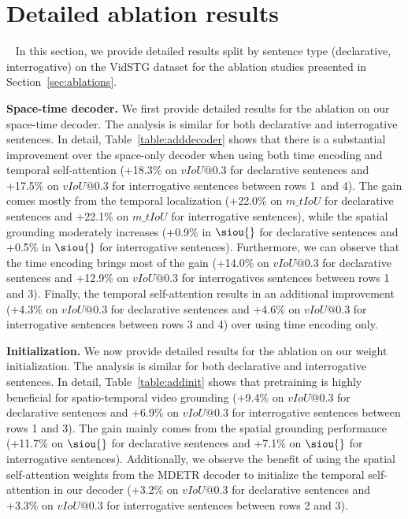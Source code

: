 \section{Detailed ablation results}~\label{sec:addablation}
In this section, we provide detailed results split by sentence type (declarative, interrogative) on the VidSTG dataset for the ablation studies presented in Section~\ref{sec:ablations}.

\noindent \textbf{Space-time decoder.}\label{sec:adddecoderres}
We first provide detailed results for the ablation on our space-time decoder. 
The analysis is similar for both declarative and interrogative sentences.
In detail, Table~\ref{table:adddecoder} shows that there is a substantial improvement over the space-only decoder when using both time encoding and temporal self-attention (+18.3\% on $vIoU@0.3$ for declarative sentences and +17.5\% on $vIoU@0.3$ for interrogative sentences between rows 1~and 4). 
The gain comes mostly from the temporal localization (+22.0\% on $m\_tIoU$ for declarative sentences and +22.1\% on $m\_tIoU$ for interrogative sentences), while the spatial grounding moderately increases (+0.9\% in $\siou{}$ for declarative sentences and +0.5\% in $\siou{}$ for interrogative sentences). 
Furthermore, we can observe that the time encoding brings most of the gain (+14.0\% on $vIoU@0.3$ for declarative sentences and +12.9\% on $vIoU@0.3$ for interrogatives sentences between rows 1 and 3).
Finally, the temporal self-attention results in an additional improvement (+4.3\% on $vIoU@0.3$ for declarative sentences and +4.6\% on $vIoU@0.3$ for interrogative sentences between rows 3 and 4) over using time encoding only. 

\noindent \textbf{Initialization.}\label{sec:addinit}
We now provide detailed results for the ablation on our weight initialization.
The analysis is similar for both declarative and interrogative sentences.
In detail, Table~\ref{table:addinit} shows that pretraining is highly beneficial for spatio-temporal video grounding (+9.4\% on $vIoU@0.3$ for declarative sentences and +6.9\% on $vIoU@0.3$ for interrogative sentences between rows 1 and 3). 
The gain mainly comes from the spatial grounding performance (+11.7\% on $\siou{}$ for declarative sentences and +7.1\% on $\siou{}$ for interrogative sentences).
Additionally, we observe the benefit of using the spatial self-attention weights from the MDETR decoder to initialize the temporal self-attention in our decoder (+3.2\% on $vIoU@0.3$ for declarative sentences and +3.3\% on $vIoU@0.3$ for interrogative sentences between rows 2 and 3).

